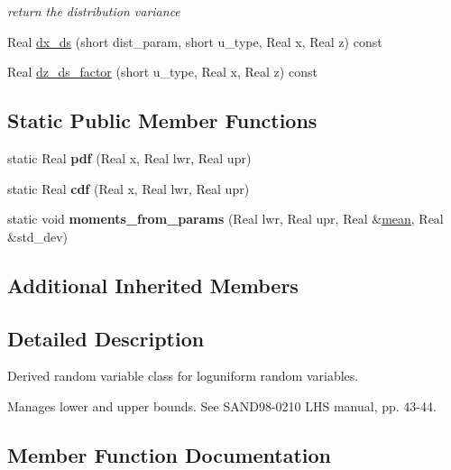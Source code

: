 \begin{DoxyCompactItemize}
\begin{DoxyCompactList}\small\item\em return the distribution variance \end{DoxyCompactList}\item 
Real \hyperlink{classPecos_1_1LoguniformRandomVariable_af889af8adfb262c9b74f573b2a9ffc99}{dx\+\_\+ds} (short dist\+\_\+param, short u\+\_\+type, Real x, Real z) const 
\item 
Real \hyperlink{classPecos_1_1LoguniformRandomVariable_af6b5fc528523180bed5fc3008dcea205}{dz\+\_\+ds\+\_\+factor} (short u\+\_\+type, Real x, Real z) const 
\end{DoxyCompactItemize}
\subsection*{Static Public Member Functions}
\begin{DoxyCompactItemize}
\item 
static Real {\bfseries pdf} (Real x, Real lwr, Real upr)\label{classPecos_1_1LoguniformRandomVariable_a041c03ed04c71a52e2e966f6456f60ac}

\item 
static Real {\bfseries cdf} (Real x, Real lwr, Real upr)\label{classPecos_1_1LoguniformRandomVariable_aede5e67889821db4de4440970772d0a0}

\item 
static void {\bfseries moments\+\_\+from\+\_\+params} (Real lwr, Real upr, Real \&\hyperlink{classPecos_1_1LoguniformRandomVariable_a962ffe5a3593be370d5c883365c060f4}{mean}, Real \&std\+\_\+dev)\label{classPecos_1_1LoguniformRandomVariable_aa2fe5db8e1960533b3d1389dcfdd39a8}

\end{DoxyCompactItemize}
\subsection*{Additional Inherited Members}


\subsection{Detailed Description}
Derived random variable class for loguniform random variables. 

Manages lower and upper bounds. See S\+A\+N\+D98-\/0210 L\+HS manual, pp. 43-\/44. 

\subsection{Member Function Documentation}
